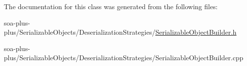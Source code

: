 The documentation for this class was generated from the following files:\begin{DoxyCompactItemize}
\item 
soa-\/plus-\/plus/SerializableObjects/DeserializationStrategies/\hyperlink{_serializable_object_builder_8h}{SerializableObjectBuilder.h}\item 
soa-\/plus-\/plus/SerializableObjects/DeserializationStrategies/SerializableObjectBuilder.cpp\end{DoxyCompactItemize}
